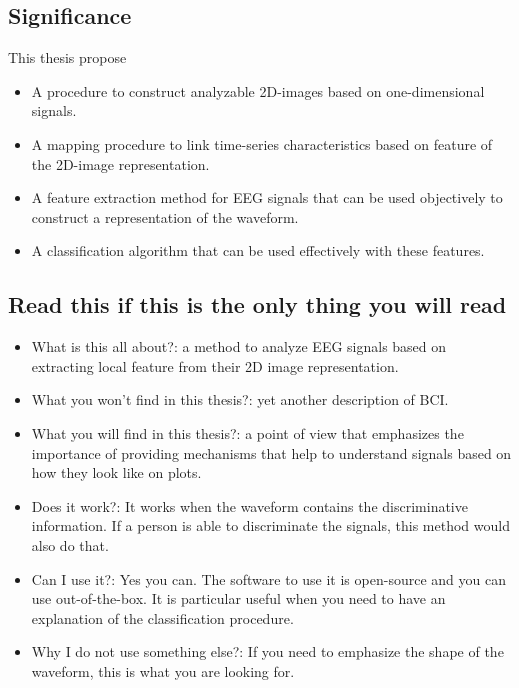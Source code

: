 \subsection{Significance}

This thesis propose

\begin{itemize}
\item A procedure to construct analyzable 2D-images based on one-dimensional signals.
\item A mapping procedure to link time-series characteristics based on feature of the 2D-image representation.
\item A feature extraction method for EEG signals that can be used objectively to construct a representation of the waveform.
\item A classification algorithm that can be used effectively with these features.
\end{itemize}

\subsection{Read this if this is the only thing you will read}

\begin{itemize}
\item What is this all about?: a method to analyze EEG signals based on extracting local feature from their 2D image representation.
\item What you won't find in this thesis?: yet another description of BCI.
\item What you will find in this thesis?: a point of view that emphasizes the importance of providing mechanisms that help to understand signals based on how they look like on plots.
\item Does it work?: It works when the waveform contains the discriminative information.  If a person is able to discriminate the signals, this method would also do that.
\item Can I use it?:  Yes you can.  The software to use it is open-source and you can use out-of-the-box.  It is particular useful when you need to have an explanation of the classification procedure.
\item Why I do not use something else?: If you need to emphasize the shape of the waveform, this is what you are looking for.
\end{itemize}

